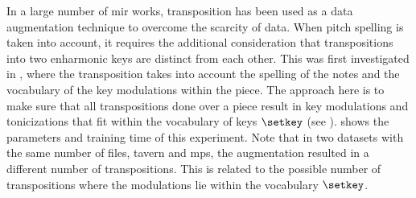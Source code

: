 
In a large number of \gls{mir} works, transposition has been
used as a data augmentation technique to overcome the
scarcity of data. When pitch spelling is taken into account,
it requires the additional consideration that transpositions
into two enharmonic keys are distinct from each other. This
was first investigated in \textcite{micchi2020not}, where
the transposition takes into account the spelling of the
notes and the vocabulary of the key modulations within the
piece. The approach here is to make sure that all
transpositions done over a piece result in key modulations
and tonicizations that fit within the vocabulary of keys
$\setkey$ (see ).
 shows the parameters and
training time of this experiment. Note that in two datasets
with the same number of files, \gls{tavern} and \gls{mps},
the augmentation resulted in a different number of
transpositions. This is related to the possible number of
transpositions where the modulations lie within the
vocabulary $\setkey$.

